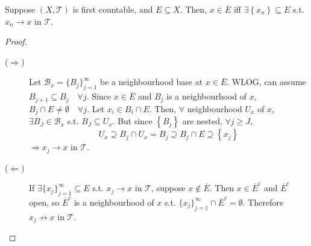 \begin{prop}
    Suppose $(X, \mathcal{T})$ is first countable, and $E \subseteq X$. Then, $x \in \overline{E}$
    iff $\exists \left\{ x_n \right\} \subseteq E$ s.t. $x_n \to x$ in $\mathcal{T}$.      
\end{prop}

\begin{proof} \leavevmode
    \begin{description}
        \item[($\Rightarrow$)] 
            Let $\mathcal{B}_x = \{B_{j}\}_{j=1}^{\infty} $ be a neighbourhood base at $x \in \overline{E}$. WLOG, can assume $B_{j + 1} \subseteq B_j \quad \forall j$. 
            Since $x \in \overline{E}$ and $B_j$ is a neighbourhood of $x$, $B_j \cap E \neq \emptyset \quad \forall j$.
            Let $x_i \in B_i \cap E$. Then, $\forall$ neighbourhood $U_x$ of $x$, $\exists B_J \in \mathcal{B}_x$ s.t. $B_J \subseteq U_x$. 
            But since $\left\{ B_j \right\}$ are nested, $\forall j \geq J$, 
            \[
                U_x \supseteq B_j \cap U_x = B_j \supseteq B_j \cap E \supseteq \left\{ x_j \right\} 
            \]           
            $\Rightarrow x_j \to x$ in $\mathcal{T}$.

        \item[($\Leftarrow$)] 
            If $\exists \{x_{j}\}_{j=1}^{\infty} \subseteq E$ s.t. $x_j \to x$ in $\mathcal{T}$, suppose $x \notin \overline{E}$. 
            Then $x \in \overline{E}^c$ and $\overline{E}^c$ open, so $\overline{E}^c$ is a neighbourhood of $x$ s.t. $\{x_{j}\}_{j=1}^{\infty} \cap \overline{E}^c = \emptyset$. 
            Therefore $x_j \not\to x$ in $\mathcal{T}$. \qedhere
    \end{description}
\end{proof}


